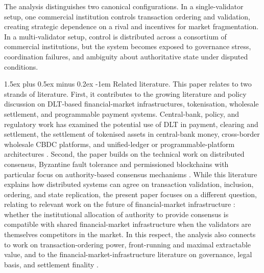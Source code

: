 \documentclass[
reprint,
showkeys,
superscriptaddress,
aps,
pra,
longbibliography,
nofootinbib,
]{revtex4-2}
\makeatletter
\theoremstyle{definition}\newtheorem{definition}{Definition}
\renewcommand\paragraph{%
	\@startsection{paragraph}{4}{\z@}%
	{1.5ex plus 0.5ex minus 0.2ex}%
	{-1em}%
	{\normalfont\normalsize\bfseries}%
}
\makeatother
\begin{document}
The analysis distinguishes two canonical configurations.
In a single-validator setup, one commercial institution controls transaction ordering and validation, creating strategic dependence on a rival and incentives for market fragmentation.
In a multi-validator setup, control is distributed across a consortium of commercial institutions, but the system becomes exposed to governance stress, coordination failures, and ambiguity about authoritative state under disputed conditions.

\paragraph{Related literature.} %
This paper relates to two strands of literature.
First, it contributes to the growing literature and policy discussion on DLT-based financial-market infrastructures, tokenisation, wholesale settlement, and programmable payment systems.
Central-bank, policy, and regulatory work has examined the potential use of DLT in payment, clearing and settlement, the settlement of tokenised assets in central-bank money, cross-border wholesale CBDC platforms, and unified-ledger or programmable-platform architectures \cite{cpmiDlt2017, auerMonnetShin2021,bisUnifiedLedger2023,bisTokenisation2024,oecdTokenisation2024,projectHelvetia,projectJura,bisMbridge2022,nyicCedarAppendix}.
Second, the paper builds on the technical work on distributed consensus, Byzantine fault tolerance and permissioned blockchains with particular focus on authority-based consensus mechanisms \cite{lamportByzantine1982,lamport1998paxos,ongaro2014raft,hyperledgerfabric,brown2016corda,szilagyi2017clique,moniz2020ibft,saltini2019ibft2}.
While this literature explains how distributed systems can agree on transaction validation, inclusion, ordering, and state replication, the present paper focuses on a different question, relating to relevant work on the future of financial-market infrastructure \cite{mills2016dlt,cpmiDlt2017,oecdTokenisation2020,bisUnifiedLedger2023,bisUnifiedLedger2025,oecdTokenisation2024}: whether the institutional allocation of authority to provide consensus is compatible with shared financial-market infrastructure when the validators are themselves competitors in the market.
In this respect, the analysis also connects to work on transaction-ordering power, front-running and maximal extractable value, and to the financial-market-infrastructure literature on governance, legal basis, and settlement finality \cite{daian2020flashboys,eskandari2019transparent}.
\end{document}
